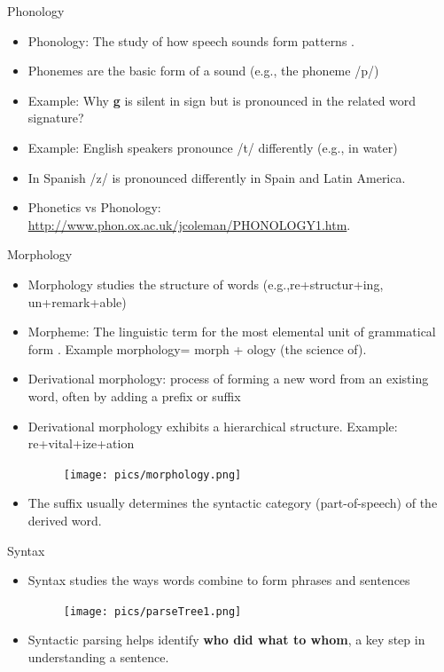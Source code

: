 \documentclass[handout]{beamer}
\begin{document}
\begin{frame}{Phonology}
\scriptsize{
\begin{itemize}
\item Phonology: The study of how speech sounds form patterns \cite{fromkin2018introduction}.
\item Phonemes are  the basic form of a sound (e.g., the phoneme /p/)
\item Example: Why \textbf{g} is silent in sign but is pronounced in the related word signature?
\item Example: English speakers pronounce /t/ differently (e.g., in water)
\item In Spanish /z/ is pronounced differently in Spain and Latin America.
\item Phonetics vs Phonology: \url{http://www.phon.ox.ac.uk/jcoleman/PHONOLOGY1.htm}.
\end{itemize}
}
\end{frame}




\begin{frame}{Morphology}
\scriptsize{


\begin{itemize}
\item Morphology studies the structure of words (e.g.,re+structur+ing, un+remark+able) \cite{JohnsonMLSS}  
\item Morpheme: The linguistic term for the most elemental unit of grammatical form \cite{fromkin2018introduction}. Example morphology= morph + ology (the science of).
\item Derivational morphology: process of forming a new word from an existing word, often by adding a prefix or suffix 
\item Derivational morphology exhibits a hierarchical structure. Example: re+vital+ize+ation
     \begin{figure}[h]
        	\texttt{[image: pics/morphology.png]}
        \end{figure}
\item The suffix usually determines the syntactic category (part-of-speech) of the derived word.        
\end{itemize}

}


\end{frame}



\begin{frame}{Syntax}
\scriptsize{
\begin{itemize}
\item Syntax studies the ways words combine to form phrases and sentences \cite{JohnsonMLSS}
     \begin{figure}[h]
        	\texttt{[image: pics/parseTree1.png]}
        \end{figure}
\item Syntactic parsing helps identify \textbf{who did what to whom}, a key step in
understanding a sentence.       
\end{itemize}

}


\end{frame}
\end{document}
